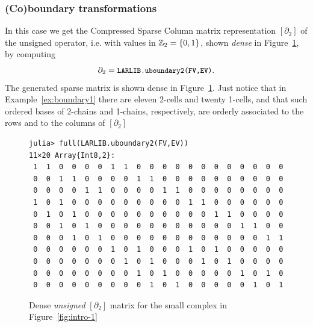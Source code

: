 \subsubsection{(Co)boundary transformations}


\begin{example}

In this case we get the Compressed Sparse Column matrix representation $[\partial_2]$ of the unsigned operator, i.e. with values in $\mathbb{Z}_2=\{0,1\}$, shown \emph{dense} in Figure~\ref{fig:intro-3}, by computing
\[
\partial_2 = \small\texttt{LARLIB.uboundary2(FV,EV)}.
\]
The generated sparse matrix is shown dense in Figure~\ref{fig:intro-3}.
Just notice that in Example~\ref{ex:boundary1} there are eleven 2-cells and twenty 1-cells, and that such ordered bases of 2-chains and 1-chains, respectively, are orderly associated to the rows and to the columns of $[\partial_2]$

\begin{figure}[htbp] %
\small\begin{verbatim}
julia> full(LARLIB.uboundary2(FV,EV))
11×20 Array{Int8,2}:
 1  1  0  0  0  0  1  1  0  0  0  0  0  0  0  0  0  0  0  0
 0  0  1  1  0  0  0  0  1  1  0  0  0  0  0  0  0  0  0  0
 0  0  0  0  1  1  0  0  0  0  1  1  0  0  0  0  0  0  0  0
 1  0  1  0  0  0  0  0  0  0  0  0  1  1  0  0  0  0  0  0
 0  1  0  1  0  0  0  0  0  0  0  0  0  0  1  1  0  0  0  0
 0  0  1  0  1  0  0  0  0  0  0  0  0  0  0  0  1  1  0  0
 0  0  0  1  0  1  0  0  0  0  0  0  0  0  0  0  0  0  1  1
 0  0  0  0  0  0  1  0  1  0  0  0  1  0  1  0  0  0  0  0
 0  0  0  0  0  0  0  1  0  1  0  0  0  1  0  1  0  0  0  0
 0  0  0  0  0  0  0  0  1  0  1  0  0  0  0  0  1  0  1  0
 0  0  0  0  0  0  0  0  0  1  0  1  0  0  0  0  0  1  0  1
\end{verbatim}
   \caption{Dense \emph{unsigned} $[\partial_2]$ matrix for the small complex in Figure~\ref{fig:intro-1}}
   \label{fig:intro-3}
\end{figure}

\end{example}


